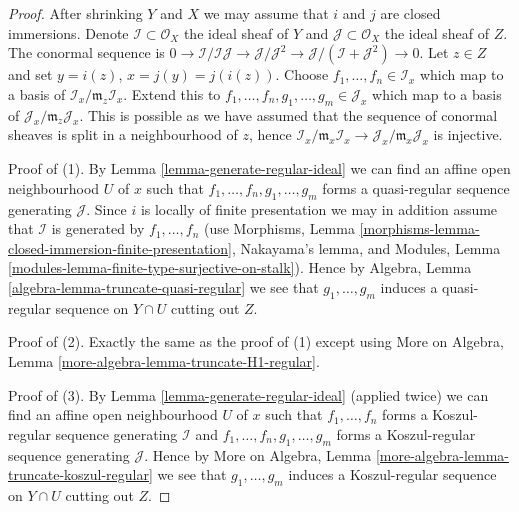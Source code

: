 \begin{proof}
After shrinking $Y$ and $X$ we may assume that $i$ and $j$ are closed
immersions. Denote $\mathcal{I} \subset \mathcal{O}_X$ the ideal sheaf
of $Y$ and $\mathcal{J} \subset \mathcal{O}_X$ the ideal sheaf of $Z$.
The conormal sequence is $0 \to \mathcal{I}/\mathcal{I}\mathcal{J}
\to \mathcal{J}/\mathcal{J}^2 \to
\mathcal{J}/(\mathcal{I} + \mathcal{J}^2) \to 0$.
Let $z \in Z$ and set $y = i(z)$, $x = j(y) = j(i(z))$.
Choose $f_1, \ldots, f_n \in \mathcal{I}_x$ which map to a basis of
$\mathcal{I}_x/\mathfrak m_z\mathcal{I}_x$. Extend this to
$f_1, \ldots, f_n, g_1, \ldots, g_m \in \mathcal{J}_x$
which map to a basis of $\mathcal{J}_x/\mathfrak m_z\mathcal{J}_x$.
This is possible as we have assumed that the sequence of conormal
sheaves is split in a neighbourhood of $z$, hence
$\mathcal{I}_x/\mathfrak m_x\mathcal{I}_x \to
\mathcal{J}_x/\mathfrak m_x\mathcal{J}_x$ is injective.

\medskip\noindent
Proof of (1). By
Lemma \ref{lemma-generate-regular-ideal}
we can find an affine open neighbourhood $U$ of $x$ such that
$f_1, \ldots, f_n, g_1, \ldots, g_m$ forms a quasi-regular sequence
generating $\mathcal{J}$. Since $i$ is locally of finite presentation
we may in addition assume that $\mathcal{I}$ is generated by
$f_1, \ldots, f_n$ (use
Morphisms, Lemma \ref{morphisms-lemma-closed-immersion-finite-presentation},
Nakayama's lemma, and
Modules, Lemma \ref{modules-lemma-finite-type-surjective-on-stalk}).
Hence by
Algebra, Lemma \ref{algebra-lemma-truncate-quasi-regular}
we see that $g_1, \ldots, g_m$ induces a quasi-regular sequence on
$Y \cap U$ cutting out $Z$.

\medskip\noindent
Proof of (2). Exactly the same as the proof of (1) except using
More on Algebra, Lemma \ref{more-algebra-lemma-truncate-H1-regular}.

\medskip\noindent
Proof of (3). By
Lemma \ref{lemma-generate-regular-ideal}
(applied twice)
we can find an affine open neighbourhood $U$ of $x$ such that
$f_1, \ldots, f_n$ forms a Koszul-regular sequence generating
$\mathcal{I}$ and $f_1, \ldots, f_n, g_1, \ldots, g_m$ forms a
Koszul-regular sequence generating $\mathcal{J}$. Hence by
More on Algebra, Lemma \ref{more-algebra-lemma-truncate-koszul-regular}
we see that $g_1, \ldots, g_m$ induces a Koszul-regular sequence on
$Y \cap U$ cutting out $Z$.
\end{proof}

